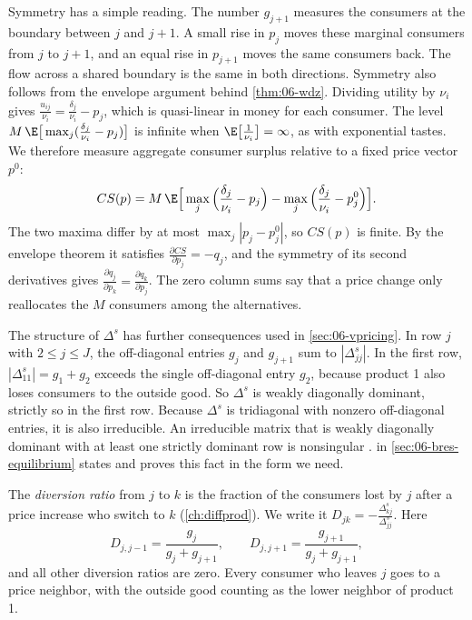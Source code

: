 Symmetry has a simple reading. The number $g_{j+1}$ measures the consumers at the boundary between $j$
and $j + 1$. A small rise in $p_j$ moves these marginal consumers from $j$ to $j + 1$, and an equal rise in
$p_{j+1}$ moves the same consumers back. The flow across a shared boundary is the same in both directions.
Symmetry also follows from the envelope argument behind \cref{thm:06-wdz}. Dividing utility by $\nu_i$ gives
$\frac{u_{ij}}{\nu_i} = \frac{\delta_j}{\nu_i} - p_j$, which is quasi-linear in money for each consumer.
The level $M\,\E\big[\max_j(\frac{\delta_j}{\nu_i} - p_j)\big]$ is infinite when $\E\big[\frac{1}{\nu_i}\big] = \infty$,
as with exponential tastes. We therefore measure aggregate consumer surplus relative to a fixed price vector $p^0$:
\begin{equation*}
  CS(p) = M\,\E\Big[\max_j\Big(\frac{\delta_j}{\nu_i} - p_j\Big) - \max_j\Big(\frac{\delta_j}{\nu_i} - p^0_j\Big)\Big].
\end{equation*}
The two maxima differ by at most $\max_j|p_j - p^0_j|$, so $CS(p)$ is finite. By the envelope theorem it
satisfies $\frac{\partial CS}{\partial p_j} = -q_j$, and the symmetry of its second derivatives gives
$\frac{\partial q_j}{\partial p_k} = \frac{\partial q_k}{\partial p_j}$. The zero column sums say that a price
change only reallocates the $M$ consumers among the alternatives.

The structure of $\Delta^s$ has further consequences used in \cref{sec:06-vpricing}. In row $j$ with
$2 \le j \le J$, the off-diagonal entries $g_j$ and $g_{j+1}$ sum to $|\Delta^s_{jj}|$. In the first row,
$|\Delta^s_{11}| = g_1 + g_2$ exceeds the single off-diagonal entry $g_2$, because product 1 also loses consumers
to the outside good. So $\Delta^s$ is weakly diagonally dominant, strictly so in the first row. Because $\Delta^s$ is
tridiagonal with nonzero off-diagonal entries, it is also irreducible. An irreducible matrix that is weakly
diagonally dominant with at least one strictly dominant row is nonsingular \citep[ch.~6]{BermanPlemmons1994}.
 in \cref{sec:06-bres-equilibrium} states and proves this fact in the form we need.

The \emph{diversion ratio} from $j$ to $k$ is the fraction of the consumers lost by $j$ after a price
increase who switch to $k$ (\cref{ch:diffprod}). We write it $D_{jk} = -\frac{\Delta^s_{kj}}{\Delta^s_{jj}}$. Here
\begin{equation*}
  D_{j,j-1} = \frac{g_j}{g_j + g_{j+1}}, \qquad
  D_{j,j+1} = \frac{g_{j+1}}{g_j + g_{j+1}},
\end{equation*}
and all other diversion ratios are zero. Every consumer who leaves $j$ goes to a price neighbor, with the
outside good counting as the lower neighbor of product 1.

